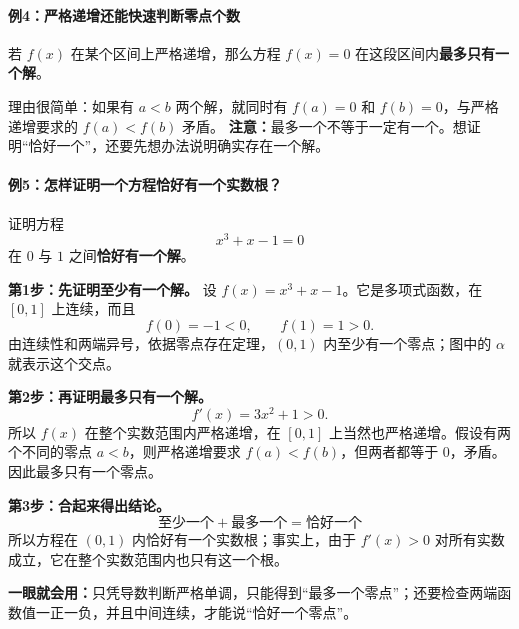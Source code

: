 \begin{examplebox}
\paragraph{例4：严格递增还能快速判断零点个数}
若 $f(x)$ 在某个区间上严格递增，那么方程 $f(x)=0$ 在这段区间内\textbf{最多只有一个解}。

理由很简单：如果有 $a<b$ 两个解，就同时有 $f(a)=0$ 和 $f(b)=0$，与严格递增要求的 $f(a)<f(b)$ 矛盾。
\textbf{注意：}最多一个不等于一定有一个。想证明``恰好一个''，还要先想办法说明确实存在一个解。


\par\medskip
\noindent\begin{minipage}{\linewidth}
\paragraph{例5：怎样证明一个方程恰好有一个实数根？}
\begin{center}\end{center}
\end{minipage}\par\medskip
证明方程
\[
x^3+x-1=0
\]
在 $0$ 与 $1$ 之间\textbf{恰好有一个解}。

\textbf{第1步：先证明至少有一个解。}
设 $f(x)=x^3+x-1$。它是多项式函数，在 $[0,1]$ 上连续，而且
\[
f(0)=-1<0,\qquad f(1)=1>0.
\]
由连续性和两端异号，依据零点存在定理，$(0,1)$ 内至少有一个零点；图中的 $\alpha$ 就表示这个交点。

\textbf{第2步：再证明最多只有一个解。}
\[
f'(x)=3x^2+1>0.
\]
所以 $f(x)$ 在整个实数范围内严格递增，在 $[0,1]$ 上当然也严格递增。假设有两个不同的零点 $a<b$，则严格递增要求 $f(a)<f(b)$，但两者都等于 $0$，矛盾。因此最多只有一个零点。

\textbf{第3步：合起来得出结论。}
\[
\boxed{\text{至少一个}+\text{最多一个}=\text{恰好一个}}
\]
所以方程在 $(0,1)$ 内恰好有一个实数根；事实上，由于 $f'(x)>0$ 对所有实数成立，它在整个实数范围内也只有这一个根。

\textbf{一眼就会用：}只凭导数判断严格单调，只能得到``最多一个零点''；还要检查两端函数值一正一负，并且中间连续，才能说``恰好一个零点''。
\end{examplebox}
